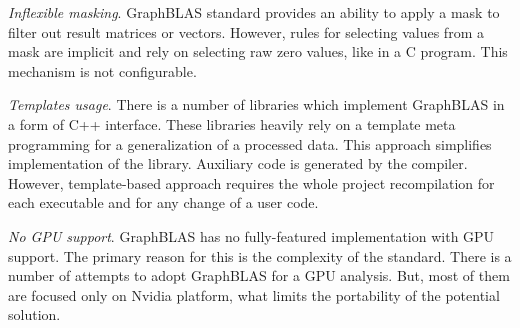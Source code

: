 \textit{Inflexible masking}. GraphBLAS standard provides an ability to apply a mask to filter out result matrices or vectors. However, rules for selecting values from a mask are implicit and rely on selecting raw zero values, like in a C program. This mechanism is not configurable.

\textit{Templates usage}. There is a number of libraries which implement GraphBLAS in a form of C++ interface. These libraries heavily rely on a template meta programming for a generalization of a processed data. This approach simplifies implementation of the library. Auxiliary code is generated by the compiler. However, template-based approach requires the whole project recompilation for each executable and for any change of a user code.

\textit{No GPU support}. GraphBLAS has no fully-featured implementation with GPU support. The primary reason for this is the complexity of the standard. There is a number of attempts to adopt GraphBLAS for a GPU analysis. But, most of them are focused only on Nvidia platform, what limits the portability of the potential solution.